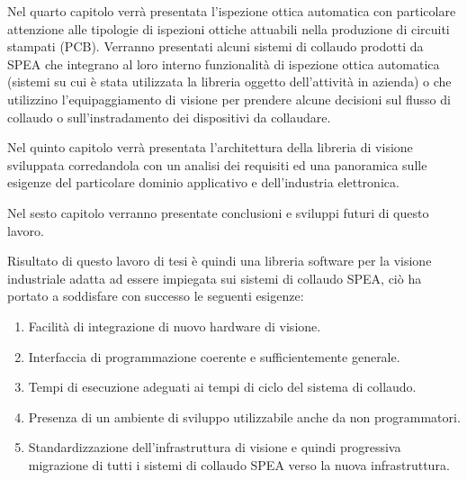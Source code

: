 Nel quarto capitolo verrà presentata l'ispezione ottica automatica con particolare attenzione alle tipologie di ispezioni ottiche attuabili nella produzione di circuiti stampati (PCB). Verranno presentati alcuni sistemi di collaudo prodotti da SPEA che integrano al loro interno funzionalità di ispezione ottica automatica (sistemi su cui è stata utilizzata la libreria oggetto dell'attività in azienda) o che utilizzino l'equipaggiamento di visione per prendere alcune decisioni sul flusso di collaudo o sull'instradamento dei dispositivi da collaudare.

Nel quinto capitolo verrà presentata l'architettura della libreria di visione sviluppata corredandola con un analisi dei requisiti ed una panoramica sulle esigenze del particolare dominio applicativo e dell'industria elettronica.

Nel sesto capitolo verranno presentate conclusioni e sviluppi futuri di questo lavoro.

Risultato di questo lavoro di tesi è quindi una libreria software per la visione industriale adatta ad essere impiegata sui sistemi di collaudo SPEA, ciò ha portato a soddisfare con successo le seguenti esigenze:

\begin{enumerate}
\item Facilità di integrazione di nuovo hardware di visione.
\item Interfaccia di programmazione coerente e sufficientemente generale.
\item Tempi di esecuzione adeguati ai tempi di ciclo del sistema di collaudo.
\item Presenza di un ambiente di sviluppo utilizzabile anche da non programmatori.
\item Standardizzazione dell'infrastruttura di visione e quindi progressiva migrazione
di tutti i sistemi di collaudo SPEA verso la nuova infrastruttura.
\end{enumerate}

\endinput